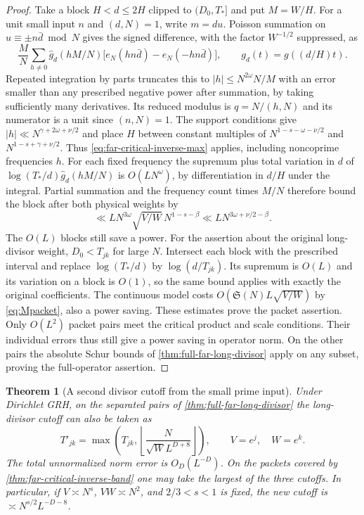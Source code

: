 \documentclass[11pt,a4paper]{article}
\numberwithin{equation}{section}
\newtheorem{theorem}{Theorem}[section]
\newcommand{\SSS}{\mathfrak S}
\begin{document}
\begin{proof}
Take a block $H<d\le2H$ clipped to $(D_0,T_*]$ and put $M=W/H$.
For a unit small input $n$ and $(d,N)=1$, write $m=du$.
Poisson summation on $u\equiv\pm n\bar d\bmod N$ gives the
signed difference, with the factor $W^{-1/2}$ suppressed, as
\[
 \frac MN\sum_{h\ne0}
 \widehat g_d(hM/N)
       \big[e_N(hn\bar d)-e_N(-hn\bar d)\big],
 \qquad g_d(t)=g((d/H)t).
\]
Repeated integration by parts truncates this to
$|h|\le N^{2\omega}N/M$ with an error smaller than any
prescribed negative power after summation, by taking sufficiently
many derivatives. Its reduced modulus is $q=N/(h,N)$ and its
numerator is a unit since $(n,N)=1$. The support conditions
give $|h|\ll N^{\gamma+2\omega+\nu/2}$ and place $H$ between
constant multiples of $N^{1-s-\omega-\nu/2}$ and
$N^{1-s+\gamma+\nu/2}$. Thus \eqref{eq:far-critical-inverse-max}
applies, including noncoprime frequencies $h$. For each fixed
frequency the supremum plus total variation in $d$ of
$\log(T_*/d)\widehat g_d(hM/N)$ is $O(LN^\omega)$, by
differentiation in $d/H$ under the integral. Partial summation
and the frequency count times $M/N$ therefore bound the block
after both physical weights by
\[
 \ll L N^{3\omega}\sqrt{V/W}\,N^{1-s-\beta}
 \ll L N^{3\omega+\nu/2-\beta}.
\]
The $O(L)$ blocks still save a power. For the assertion about
the original long-divisor weight, $D_0<T_{jk}$ for large $N$.
Intersect each block with the prescribed interval and replace
$\log(T_*/d)$ by $\log(d/T_{jk})$. Its supremum is $O(L)$
and its variation on a block is $O(1)$, so the same bound
applies with exactly the original coefficients. The continuous model
costs $O(\SSS(N)L\sqrt{V/W})$ by \eqref{eq:Mpacket}, also
a power saving. These estimates prove the packet assertion.
Only $O(L^2)$ packet pairs meet the critical product and scale
conditions. Their individual errors thus still give a power
saving in operator norm. On the other pairs the absolute
Schur bounds of \cref{thm:full-far-long-divisor} apply on any
subset, proving the full-operator assertion.
\end{proof}

\begin{theorem}[A second divisor cutoff from the small prime input]
\label{thm:far-critical-small-pnt}
Under Dirichlet GRH, on the separated pairs of
\cref{thm:full-far-long-divisor} the long-divisor cutoff can
also be taken as
\[
 T'_{jk}=\max\left(T_{jk},
               \left\lfloor\frac{N}{\sqrt W L^{D+8}}\right\rfloor\right),
 \qquad V=e^j,\quad W=e^k .
\]
The total unnormalized norm error is $O_D(L^{-D})$. On the
packets covered by \cref{thm:far-critical-inverse-band} one
may take the largest of the three cutoffs. In particular, if
$V\asymp N^s$, $VW\asymp N^2$, and $2/3<s<1$ is fixed,
the new cutoff is $\asymp N^{s/2}L^{-D-8}$.
\end{theorem}
\end{document}
